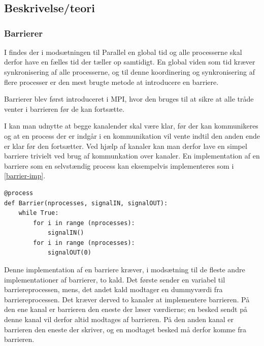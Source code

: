 \chapter{\des}
  \section{Beskrivelse/teori}\label{sec:des-theory}
   
\subsection{Barrierer}\label{barrier}
I \des findes der i modsætningen til Parallel \des {} en global 
tid og alle processerne skal derfor have en fælles tid der tæller op samtidigt.  
En global viden som tid kræver synkronisering af alle processerne, 
og til denne koordinering og synkronisering af flere processer er den mest 
brugte metode at introducere en barriere.

Barrierer blev først introduceret i MPI, hvor den bruges til at 
sikre at alle tråde venter i barrieren før de kan fortsætte. 

I \pycsp kan man udnytte at begge kanalender skal være klar, før der kan 
kommunikeres og at en process der er indgår i en kommunikation vil vente indtil 
den anden ende er klar før den fortsætter. Ved hjælp af kanaler kan man derfor 
lave en simpel barriere trivielt ved brug af kommunkation over kanaler. En 
implementation af en barriere som en selvstændig process kan eksempelvis 
implementeres som i \cref{barrier-imp}.

\begin{lstlisting}[float, label=barrier-imp,caption=En barriere i \pycsp]
@process
def Barrier(nprocesses, signalIN, signalOUT):
	while True:
		for i in range (nprocesses):
			signalIN()
		for i in range (nprocesses):
			signalOUT(0)
\end{lstlisting}

Denne implementation af en barriere kræver, i modsætning til de fleste andre implementationer af barrierer\cites{mpi-barrier, crew}, to kald. Det første sender en variabel til barriereprocessen, mens,
det andet kald modtager en dummyværdi fra barriereprocessen. Det kræver derved 
to kanaler at implementere barrieren. På den ene kanal er barrieren den eneste 
der læser værdierne; en besked sendt på denne kanal vil derfor altid modtages 
af barrieren. På den anden kanal er barrieren den eneste der skriver, og en 
modtaget besked må derfor komme fra barrieren.

